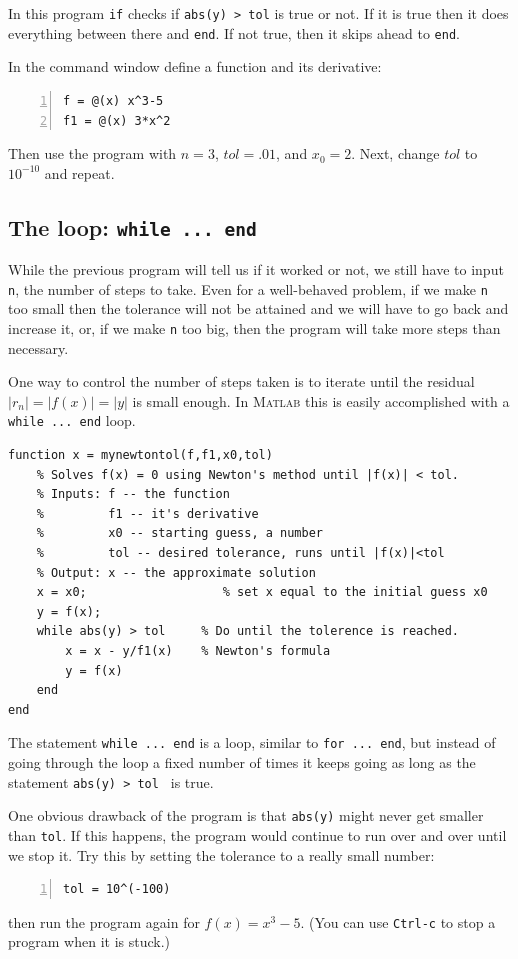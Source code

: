 In this program \verb&if& checks if \verb&abs(y) > tol&
is true or not. If it is true then it does everything
between there and \verb&end&. If not true, then it skips
ahead to \verb&end&.

In the command window define a function and its derivative:
\begin{lstlisting}[frame=none,numbers=left]
f = @(x) x^3-5
f1 = @(x) 3*x^2
\end{lstlisting}
Then use the program with $n=3$, $tol = .01$, and $x_0=2$.
Next, change $tol$ to $10^{-10}$ and repeat.


\subsection*{The loop: \texttt{while ... end}}

While the previous program will tell us if it worked or not,
we still have to input \verb&n&, the number of steps to take.
Even for a well-behaved problem, if we make \verb&n& too small
then the tolerance will not be attained and we will have to
go back and increase it, or, if we make \verb&n& too big, then
the program will take more steps than necessary.

One way to control the number of steps taken is to iterate
until the residual $|r_n| = |f(x)| = |y|$ is small enough.
In \textsc{Matlab} this is easily accomplished with a
\verb&while ... end& loop.
\begin{lstlisting}
function x = mynewtontol(f,f1,x0,tol)
    % Solves f(x) = 0 using Newton's method until |f(x)| < tol.
    % Inputs: f -- the function
    %         f1 -- it's derivative
    %         x0 -- starting guess, a number
    %         tol -- desired tolerance, runs until |f(x)|<tol
    % Output: x -- the approximate solution
    x = x0;                   % set x equal to the initial guess x0
    y = f(x);
    while abs(y) > tol     % Do until the tolerence is reached.
        x = x - y/f1(x)    % Newton's formula
        y = f(x)
    end
end
\end{lstlisting}


The statement \verb&while ... end& is a loop,
similar to \verb&for ... end&, but instead of going through the
loop a fixed number of times it keeps going as long as the statement
\verb&abs(y) > tol & is true.

One obvious drawback of the program is that \verb&abs(y)& might
never get smaller than \verb&tol&. If this happens, the program
would continue to run over and over until we stop it. Try this
by setting the tolerance to a really small number:
\begin{lstlisting}[frame=none,numbers=left]
tol = 10^(-100)
\end{lstlisting}
then run the program again for $f(x) = x^3 - 5$.
(You can use \verb&Ctrl-c& to stop a program when it is stuck.)

